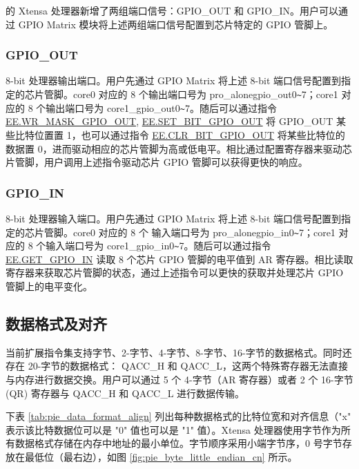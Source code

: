 \documentclass[main\_\_CN.tex]{subfiles}
\begin{document}
\chipname{} 的 Xtensa 处理器新增了两组端口信号：GPIO\_OUT 和 GPIO\_IN。用户可以通过 GPIO Matrix 模块将上述两组端口信号配置到芯片特定的 GPIO 管脚上。

\subsubsection{GPIO\_OUT}

8-bit 处理器输出端口。用户先通过 GPIO Matrix 将上述 8-bit 端口信号配置到指定的芯片管脚。core0 对应的 8 个输出端口号为 pro\_alonegpio\_out0\verb+~+7；core1 对应的 8 个输出端口号为 core1\_gpio\_out0\verb+~+7。随后可以通过指令 \hyperref[instruction:EEWRMASKGPIOOUT]{EE.WR\_MASK\_GPIO\_OUT}, \hyperref[instruction:EESETBITGPIOOUT]{EE.SET\_BIT\_GPIO\_OUT} 将 GPIO\_OUT 某些比特位置置 1，也可以通过指令 \hyperref[instruction:EECLRBITGPIOOUT]{EE.CLR\_BIT\_GPIO\_OUT} 将某些比特位的数据置 0，进而驱动相应的芯片管脚为高或低电平。相比通过配置寄存器来驱动芯片管脚，用户调用上述指令驱动芯片 GPIO 管脚可以获得更快的响应。

\subsubsection{GPIO\_IN}

8-bit 处理器输入端口。用户先通过 GPIO Matrix 将上述 8-bit 端口信号配置到指定的芯片管脚。core0 对应的 8 个
输入端口号为 pro\_alonegpio\_in0\verb+~+7；core1 对应的 8 个输入端口号为 core1\_gpio\_in0\verb+~+7。随后可以通过指令 \hyperref[instruction:EEGETGPIOIN]{EE.GET\_GPIO\_IN} 读取 8 个芯片 GPIO 管脚的电平值到 AR 寄存器。相比读取寄存器来获取芯片管脚的状态，通过上述指令可以更快的获取并处理芯片 GPIO 管脚上的电平变化。

\subsection{数据格式及对齐}
\label{sec:pie-data-align}
当前扩展指令集支持字节、2-字节、4-字节、8-字节、16-字节的数据格式。同时还存在 20-字节的数据格式： QACC\_H 和 QACC\_L，这两个特殊寄存器无法直接与内存进行数据交换。用户可以通过 5 个 4-字节（AR 寄存器）或者 2 个 16-字节 (QR) 寄存器与 QACC\_H 和 QACC\_L 进行数据传输。

下表 \ref{tab:pie_data_format_align} 列出每种数据格式的比特位宽和对齐信息（"x" 表示该比特数据位可以是 "0" 值也可以是 "1" 值）。Xtensa 处理器使用字节作为所有数据格式存储在内存中地址的最小单位。字节顺序采用小端字节序，0 号字节存放在最低位（最右边），如图 \ref{fig:pie_byte_little_endian_cn} 所示。
\end{document}
